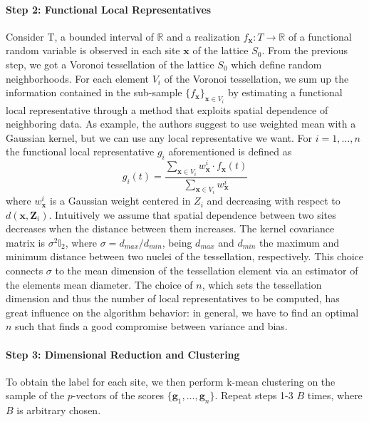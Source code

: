 \paragraph{Step 2: Functional Local Representatives} Consider T, a bounded interval of $\mathbb{R}$ and a realization $f_{\mathbf{x}}:T\rightarrow \mathbb{R}$ of a functional random variable is observed in each site $\mathbf{x}$ of the lattice $S_0$. From the previous step, we got a Voronoi tessellation of the lattice $S_0$ which define random neighborhoods. For each element $V_i$ of the Voronoi tessellation, we sum up the information contained in the sub-sample $\{f_{\mathbf{x}}\}_{\mathbf{x} \in V_i}$ by estimating a functional local representative through a method that exploits spatial dependence of neighboring data. As example, the authors suggest to use weighted mean with a Gaussian kernel, but we can use any local representative we want. For $i=1, \dots, n$ the functional local representative $g_i$ aforementioned is defined as
\begin{equation}
    \label{eq:gaussianmean}
    g_i(t)=\frac{\sum_{\mathbf{x}\in V_i}w^i_{\mathbf{x}}\cdot f_{\mathbf{x}}(t)}{\sum_{\mathbf{x}\in V_i}w^i_{\mathbf{x}}}
\end{equation}
where $w_{\mathbf{x}}^i$ is a Gaussian weight centered in $Z_i$ and decreasing with respect to $d\left(\mathbf{x}, \mathbf{Z}_i\right)$. Intuitively we assume that spatial dependence between two sites decreases when the distance between them increases. The kernel covariance matrix is $\sigma^2\mathbb{I}_2$, where $\sigma=d_{max}/d_{min}$, being $d_{max}$ and $d_{min}$ the maximum and minimum distance between two nuclei of the tessellation, respectively. This choice connects $\sigma$ to the mean dimension of the tessellation element via an estimator of the elements mean diameter. The choice of $n$, which sets the tessellation dimension and thus the number of local representatives to be computed, has great influence on the algorithm behavior: in general, we have to find an optimal $n$ such that finds a good compromise between variance and bias.

\paragraph{Step 3: Dimensional Reduction and Clustering} To obtain the label for each site, we then perform k-mean clustering on the sample of the $p$-vectors of the scores $\{\mathbf{g}_1, \dots, \mathbf{g}_n\}$. Repeat steps 1-3 $B$ times, where $B$ is arbitrary chosen. 

